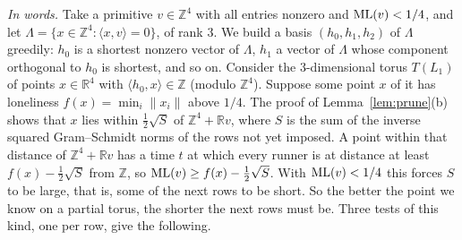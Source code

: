 \documentclass[11pt]{article}
\theoremstyle{remark}
\newcommand{\R}{\mathbb{R}}
\newcommand{\Z}{\mathbb{Z}}
\newcommand{\dist}[1]{\lVert #1\rVert}
\begin{document}
\emph{In words.} Take a primitive $v\in\Z^4$ with all entries nonzero and $\mathrm{ML}(v)<1/4$, and let $\Lambda=\{x\in\Z^4:\langle x,v\rangle=0\}$, of rank $3$. We build a basis $(h_0,h_1,h_2)$ of $\Lambda$ greedily: $h_0$ is a shortest nonzero vector of $\Lambda$, $h_1$ a vector of $\Lambda$ whose component orthogonal to $h_0$ is shortest, and so on. Consider the $3$-dimensional torus $T(L_1)$ of points $x\in\R^4$ with $\langle h_0,x\rangle\in\Z$ (modulo $\Z^4$). Suppose some point $x$ of it has loneliness $f(x)=\min_i\dist{x_i}$ above $1/4$. The proof of Lemma~\ref{lem:prune}(b) shows that $x$ lies within $\tfrac12\sqrt{S}$ of $\Z^4+\R v$, where $S$ is the sum of the inverse squared Gram--Schmidt norms of the rows not yet imposed. A point within that distance of $\Z^4+\R v$ has a time $t$ at which every runner is at distance at least $f(x)-\tfrac12\sqrt S$ from $\Z$, so $\mathrm{ML}(v)\ge f(x)-\tfrac12\sqrt S$. With $\mathrm{ML}(v)<1/4$ this forces $S$ to be large, that is, some of the next rows to be short. So the better the point we know on a partial torus, the shorter the next rows must be. Three tests of this kind, one per row, give the following.
\end{document}
